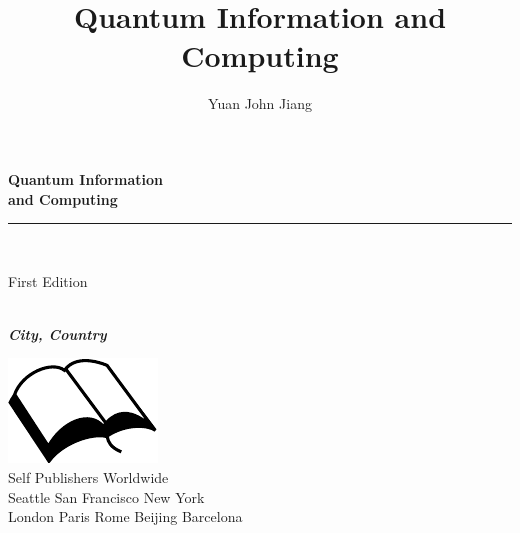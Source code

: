 \documentclass{book}
\title{Quantum Information and Computing}
\author{Yuan John Jiang}
\makeatletter
\newcommand{\booksubtitle}{A Textbook for Computer Science and Engineering Students}
\newcommand{\authorsubtitle}{City, Country}
\newcommand{\bookauthor}{\@author}
\makeatother
\begin{document}
\frontmatter



\begin{titlepage}
\begin{flushleft}

\textbf{\fontsize{38}{50}\selectfont Quantum Information\\and Computing\\}

\par\noindent\rule{\textwidth}{4pt}\\


\begin{flushright}
\Large First Edition
\end{flushright}

\vspace{\fill}

\textbf{\large \bookauthor}\\[3.5pt]
\textbf{\large \textit{\authorsubtitle}}

\vspace{\fill}

\begin{center}
\includegraphics{booksvg.pdf}\\[4pt]
\small{Self Publishers Worldwide\\
Seattle San Francisco New York\\
London Paris Rome Beijing Barcelona}
\end{center}

\end{flushleft}
\end{titlepage}
\restoregeometry
\end{document}
